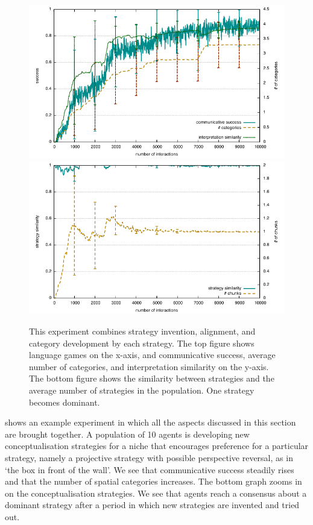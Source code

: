 \begin{figure}
\begin{center}
\includegraphics[width=\textwidth]{chap12/figs/chunk-alignment-category-invention-success.pdf}
\includegraphics[width=\textwidth]{chap12/figs/chunk-alignment-category-invention-alignment.pdf}
\caption{This experiment combines strategy invention, alignment, and category development by each strategy. The top figure
shows language games on the x-axis, and communicative success, average 
number of categories, and interpretation similarity on the y-axis. The bottom figure shows the similarity between 
strategies and the average number of strategies in the population. One strategy becomes dominant.}
\label{fig:all}
\end{center}
\end{figure}

 shows an example experiment in which all the aspects discussed in this section are brought together. 
A population of 10 agents is developing new conceptualisation strategies for a niche that encourages preference 
for a particular strategy, namely a projective strategy with possible perspective reversal, as in `the box in front 
of the wall'. We see that communicative success steadily rises and that the number of 
spatial categories increases. The bottom graph zooms in on the conceptualisation strategies. We see that agents reach 
a consensus about a dominant strategy after a period in which new strategies 
are invented and tried out.\\ 

